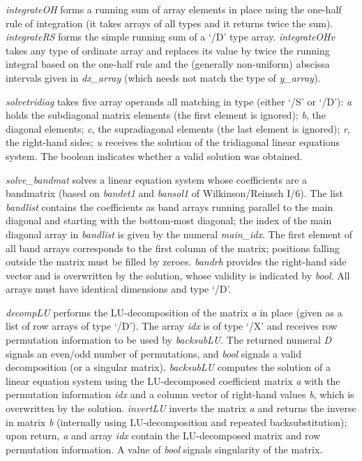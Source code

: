 \emph{integrateOH} forms a running sum of array elements in place using the one-half rule of integration (it takes arrays of all types and it returns twice the sum). \emph{integrateRS} forms the simple running sum of a `/D' type array. \emph{integrateOHv} takes any type of ordinate array and replaces its value by twice the running integral based on the one-half rule and the (generally non-uniform) abscissa intervals given in \emph{dx\_array} (which needs not match the type of \emph{y\_array}).

\emph{solvetridiag} takes five array operands all matching in type (either `/S' or `/D'): \emph{a} holds the subdiagonal matrix elements (the first element is ignored); \emph{b}, the diagonal elements; \emph{c}, the supradiagonal elements (the last element is ignored); \emph{r}, the right-hand sides; \emph{u} receives the solution of the tridiagonal linear equations system. The boolean indicates whether a valid solution was obtained.

\emph{solve\_bandmat} solves a linear equation system whose coefficients are a bandmatrix (based on \emph{bandet1} and \emph{bansol1} of Wilkinson/Reinsch I/6). The list \emph{bandlist} contains the coefficients as band arrays running parallel to the main diagonal and starting with the bottom-most diagonal; the index of the main diagonal array in \emph{bandlist} is given by the numeral \emph{main\_idx}. The first element of all band arrays corresponds to the first column of the matrix; positions falling outside the matrix must be filled by zeroes. \emph{bandrh} provides the right-hand side vector and is overwritten by the solution, whose validity is indicated by \emph{bool}. All arrays must have identical dimensions and type `/D'.

\emph{decompLU} performs the LU-decomposition of the matrix \emph{a}
in place (given as a list of row arrays of type `/D'). The array
\emph{idx} is of type `/X' and receives row permutation information to
be used by \emph{backsubLU}. The returned numeral \emph{D} signals an
even/odd number of permutations, and \emph{bool} signals a valid
decomposition (or a singular matrix). \emph{backsubLU} computes the
solution of a linear equation system using the LU-decomposed
coefficient matrix \emph{a} with the permutation information
\emph{idx} and a column vector of right-hand values \emph{b}, which is
overwritten by the solution. \emph{invertLU} inverts the matrix
\emph{a} and returns the inverse in matrix \emph{b} (internally using
LU-decomposition and repeated backsubstitution); upon return, \emph{a}
and array \emph{idx} contain the LU-decomposed matrix and row
permutation information. A  value of \emph{bool} signals
singularity of the matrix.

